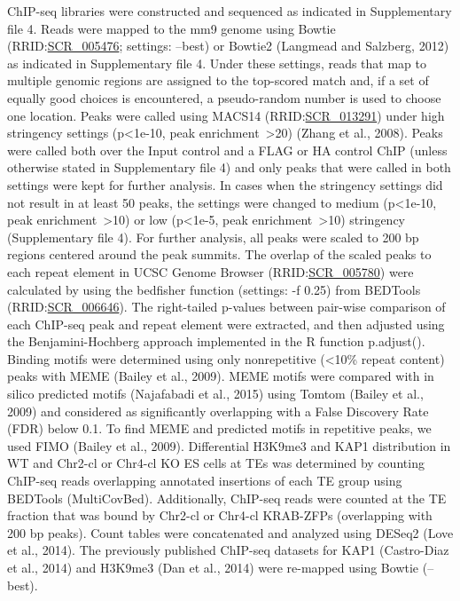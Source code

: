 \documentclass[11pt,a4paper]{article}
\begin{document}
ChIP-seq libraries were constructed and sequenced as indicated in Supplementary file 4. Reads were mapped to the mm9 genome using Bowtie (RRID:\href{https://scicrunch.org/resolver/SCR\_005476}{SCR\_005476}; settings: --best) or Bowtie2 (Langmead and Salzberg, 2012) as indicated in Supplementary file 4. Under these settings, reads that map to multiple genomic regions are assigned to the top-scored match and, if a set of equally good choices is encountered, a pseudo-random number is used to choose one location. Peaks were called using MACS14 (RRID:\href{https://scicrunch.org/resolver/SCR\_013291}{SCR\_013291}) under high stringency settings (p<1e-10, peak enrichment >20) (Zhang et al., 2008). Peaks were called both over the Input control and a FLAG or HA control ChIP (unless otherwise stated in Supplementary file 4) and only peaks that were called in both settings were kept for further analysis. In cases when the stringency settings did not result in at least 50 peaks, the settings were changed to medium (p<1e-10, peak enrichment >10) or low (p<1e-5, peak enrichment >10) stringency (Supplementary file 4). For further analysis, all peaks were scaled to 200 bp regions centered around the peak summits. The overlap of the scaled peaks to each repeat element in UCSC Genome Browser (RRID:\href{https://scicrunch.org/resolver/SCR\_005780}{SCR\_005780}) were calculated by using the bedfisher function (settings: -f 0.25) from BEDTools (RRID:\href{https://scicrunch.org/resolver/SCR\_006646}{SCR\_006646}). The right-tailed p-values between pair-wise comparison of each ChIP-seq peak and repeat element were extracted, and then adjusted using the Benjamini-Hochberg approach implemented in the R function p.adjust(). Binding motifs were determined using only nonrepetitive (<10\% repeat content) peaks with MEME (Bailey et al., 2009). MEME motifs were compared with in silico predicted motifs (Najafabadi et al., 2015) using Tomtom (Bailey et al., 2009) and considered as significantly overlapping with a False Discovery Rate (FDR) below 0.1. To find MEME and predicted motifs in repetitive peaks, we used FIMO (Bailey et al., 2009). Differential H3K9me3 and KAP1 distribution in WT and Chr2-cl or Chr4-cl KO ES cells at TEs was determined by counting ChIP-seq reads overlapping annotated insertions of each TE group using BEDTools (MultiCovBed). Additionally, ChIP-seq reads were counted at the TE fraction that was bound by Chr2-cl or Chr4-cl KRAB-ZFPs (overlapping with 200 bp peaks). Count tables were concatenated and analyzed using DESeq2 (Love et al., 2014). The previously published ChIP-seq datasets for KAP1 (Castro-Diaz et al., 2014) and H3K9me3 (Dan et al., 2014) were re-mapped using Bowtie (--best).
\end{document}
